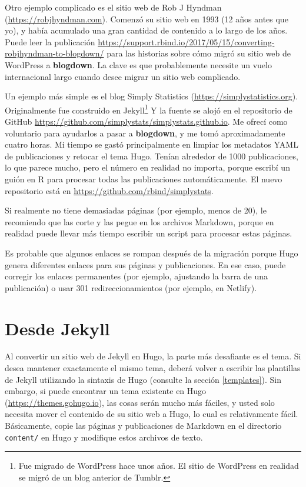 \documentclass[12pt,]{krantz}
\theoremstyle{definition}
\theoremstyle{definition}
\theoremstyle{definition}
\theoremstyle{remark}
\begin{document}
Otro ejemplo complicado es el sitio web de Rob J Hyndman
(\url{https://robjhyndman.com}). Comenzó su sitio web en 1993 (12 años
antes que yo), y había acumulado una gran cantidad de contenido a lo
largo de los años. Puede leer la publicación
\url{https://support.rbind.io/2017/05/15/converting-robjhyndman-to-blogdown/}
para las historias sobre cómo migró su sitio web de WordPress a
\textbf{blogdown}. La clave es que probablemente necesite un vuelo
internacional largo cuando desee migrar un sitio web complicado.

Un ejemplo más simple es el blog Simply Statistics
(\url{https://simplystatistics.org}). Originalmente fue construido en
Jekyll\footnote{Fue migrado de WordPress hace unos años. El sitio de
  WordPress en realidad se migró de un blog anterior de Tumblr.} Y la
fuente se alojó en el repositorio de GitHub
\url{https://github.com/simplystats/simplystats.github.io}. Me ofrecí
como voluntario para ayudarlos a pasar a \textbf{blogdown}, y me tomó
aproximadamente cuatro horas. Mi tiempo se gastó principalmente en
limpiar los metadatos YAML de publicaciones y retocar el tema Hugo.
Tenían alrededor de 1000 publicaciones, lo que parece mucho, pero el
número en realidad no importa, porque escribí un guión en R para
procesar todas las publicaciones automáticamente. El nuevo repositorio
está en \url{https://github.com/rbind/simplystats}.

Si realmente no tiene demasiadas páginas (por ejemplo, menos de 20), le
recomiendo que las corte y las pegue en los archivos Markdown, porque en
realidad puede llevar más tiempo escribir un script para procesar estas
páginas.

Es probable que algunos enlaces se rompan después de la migración porque
Hugo genera diferentes enlaces para sus páginas y publicaciones. En ese
caso, puede corregir los enlaces permanentes (por ejemplo, ajustando la
barra de una publicación) o usar 301 redireccionamientos (por ejemplo,
en Netlify).

\hypertarget{desde-jekyll}{%
\section{Desde Jekyll}\label{desde-jekyll}}

Al convertir un sitio web de Jekyll en Hugo, la parte más
desafiante es el tema. Si desea mantener exactamente el mismo tema,
deberá volver a escribir las plantillas de Jekyll utilizando la sintaxis
de Hugo (consulte la sección \ref{templates}). Sin embargo, si puede
encontrar un tema existente en Hugo (\url{https://themes.gohugo.io}),
las cosas serán mucho más fáciles, y usted solo necesita mover el
contenido de su sitio web a Hugo, lo cual es relativamente fácil.
Básicamente, copie las páginas y publicaciones de Markdown en el
directorio \texttt{content/} en Hugo y modifique estos archivos de
texto.
\end{document}
